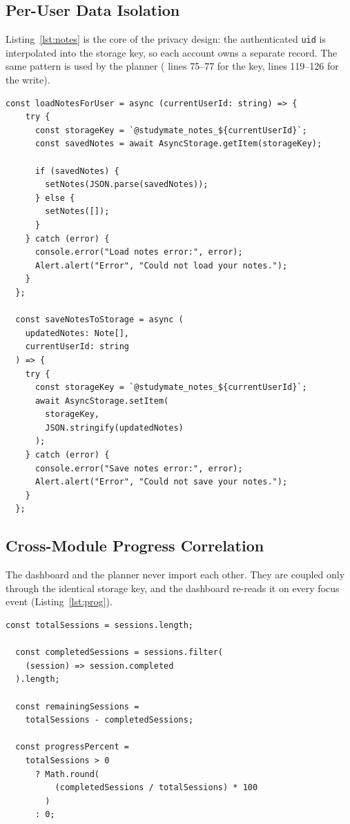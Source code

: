 \documentclass[12pt,a4paper,oneside]{report}
\newcommand{\fp}[1]{\texttt{\small\detokenize{#1}}}
\begin{document}
\subsection{Per-User Data Isolation}
Listing~\ref{lst:notes} is the core of the privacy design: the authenticated
\texttt{uid} is interpolated into the storage key, so each account owns a separate
record. The same pattern is used by the planner (\fp{app/study-planner.tsx} lines
75--77 for the key, lines 119--126 for the write).

\begin{lstlisting}[caption={Per-user notes storage in app/notes.tsx, lines 88--118}, label={lst:notes}]
  const loadNotesForUser = async (currentUserId: string) => {
    try {
      const storageKey = `@studymate_notes_${currentUserId}`;
      const savedNotes = await AsyncStorage.getItem(storageKey);

      if (savedNotes) {
        setNotes(JSON.parse(savedNotes));
      } else {
        setNotes([]);
      }
    } catch (error) {
      console.error("Load notes error:", error);
      Alert.alert("Error", "Could not load your notes.");
    }
  };

  const saveNotesToStorage = async (
    updatedNotes: Note[],
    currentUserId: string
  ) => {
    try {
      const storageKey = `@studymate_notes_${currentUserId}`;
      await AsyncStorage.setItem(
        storageKey,
        JSON.stringify(updatedNotes)
      );
    } catch (error) {
      console.error("Save notes error:", error);
      Alert.alert("Error", "Could not save your notes.");
    }
  };
\end{lstlisting}

\subsection{Cross-Module Progress Correlation}
The dashboard and the planner never import each other. They are coupled only through
the identical storage key, and the dashboard re-reads it on every focus event
(Listing~\ref{lst:prog}).

\begin{lstlisting}[caption={Progress calculation in app/(tabs)/index.tsx, lines 170--184}, label={lst:prog}]
  const totalSessions = sessions.length;

  const completedSessions = sessions.filter(
    (session) => session.completed
  ).length;

  const remainingSessions =
    totalSessions - completedSessions;

  const progressPercent =
    totalSessions > 0
      ? Math.round(
          (completedSessions / totalSessions) * 100
        )
      : 0;
\end{lstlisting}
\end{document}

